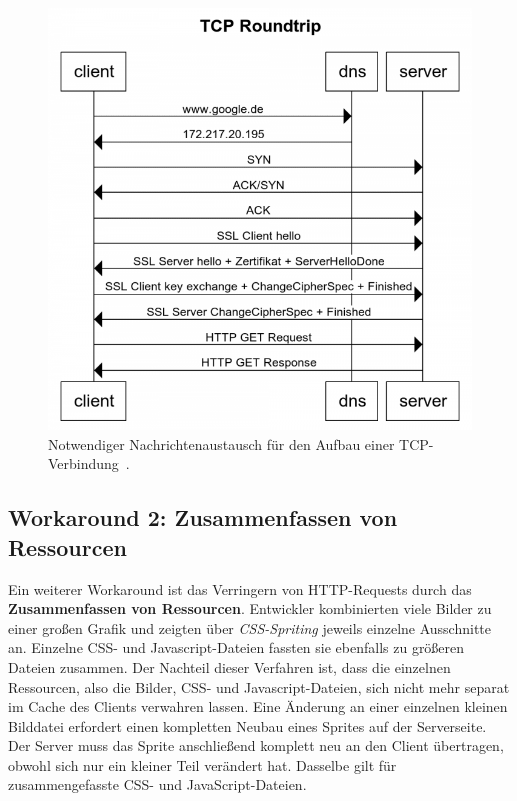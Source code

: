 \documentclass[a4paper, justified, notoc]{tufte-handout} %
\begin{document}
\begin{figure}%
	\centering
  \includegraphics[width=1\textwidth]{./figures/tcp_verbindungsaufbau.png}
  \caption{Notwendiger Nachrichtenaustausch für den Aufbau einer TCP-Verbindung~\citep{weinschenkler:2017}.}
  \label{fig:tcp_roundtrip}
\end{figure}

\subsection{Workaround 2: Zusammenfassen von Ressourcen} %
\label{sub:zusammenfassen_von_ressourcen}
Ein weiterer Workaround ist das Verringern von HTTP-Requests durch das \textbf{Zusammenfassen von Ressourcen}. Entwickler kombinierten viele Bilder zu einer großen Grafik und zeigten über \emph{CSS-Spriting} jeweils einzelne Ausschnitte an. Einzelne CSS- und Javascript-Dateien fassten sie ebenfalls zu größeren Dateien zusammen. Der Nachteil dieser Verfahren ist, dass die einzelnen Ressourcen, also die Bilder, CSS- und Javascript-Dateien, sich nicht mehr separat im Cache des Clients verwahren lassen. Eine Änderung an einer einzelnen kleinen Bilddatei erfordert einen kompletten Neubau eines Sprites auf der Serverseite. Der Server muss das Sprite anschließend komplett neu an den Client übertragen, obwohl sich nur ein kleiner Teil verändert hat. Dasselbe gilt für zusammengefasste CSS- und JavaScript-Dateien.
\end{document}
